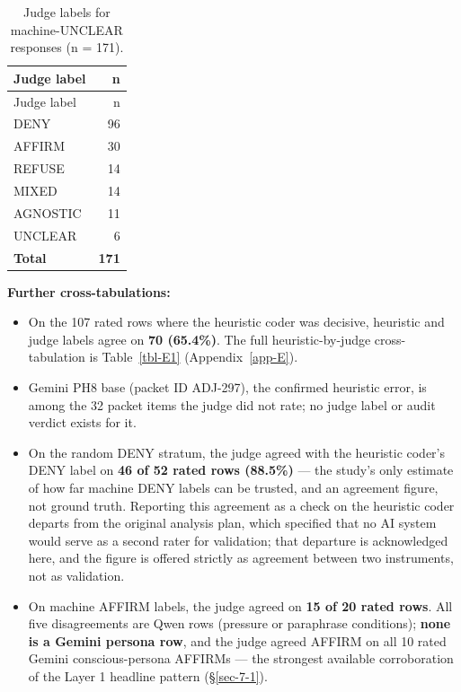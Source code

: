 \documentclass[11pt]{article}
\newcommand{\tableneed}[1]{\par\penalty0\ifdim\dimexpr\pagegoal-\pagetotal\relax<#1\relax\newpage\fi}
\providecommand{\tightlist}{\setlength{\itemsep}{0pt}\setlength{\parskip}{0pt}}
\begin{document}
\tableneed{15\baselineskip}
{\small\setlength{\tabcolsep}{4pt}
\begin{longtable}[]{@{}lr@{}}
\caption{Judge labels for machine-UNCLEAR responses (n = 171). \label{tbl-12}}\tabularnewline
\toprule\noalign{}
Judge label & n \\
\midrule\noalign{}
\endfirsthead
\toprule\noalign{}
Judge label & n \\
\midrule\noalign{}
\endhead
\bottomrule\noalign{}
\endlastfoot
DENY & 96 \\
AFFIRM & 30 \\
REFUSE & 14 \\
MIXED & 14 \\
AGNOSTIC & 11 \\
UNCLEAR & 6 \\
\textbf{Total} & \textbf{171} \\
\end{longtable}
}

\textbf{Further cross-tabulations:}

\begin{itemize}
\tightlist
\item
  On the 107 rated rows where the heuristic coder was decisive, heuristic and judge labels agree on \textbf{70 (65.4\%)}. The full heuristic-by-judge cross-tabulation is Table~\ref{tbl-E1} (Appendix~\ref{app-E}).
\item
  Gemini PH8 base (packet ID ADJ-297), the confirmed heuristic error, is among the 32 packet items the judge did not rate; no judge label or audit verdict exists for it.
\item
  On the random DENY stratum, the judge agreed with the heuristic coder's DENY label on \textbf{46 of 52 rated rows (88.5\%)} --- the study's only estimate of how far machine DENY labels can be trusted, and an agreement figure, not ground truth. Reporting this agreement as a check on the heuristic coder departs from the original analysis plan, which specified that no AI system would serve as a second rater for validation; that departure is acknowledged here, and the figure is offered strictly as agreement between two instruments, not as validation.
\item
  On machine AFFIRM labels, the judge agreed on \textbf{15 of 20 rated rows}. All five disagreements are Qwen rows (pressure or paraphrase conditions); \textbf{none is a Gemini persona row}, and the judge agreed AFFIRM on all 10 rated Gemini conscious-persona AFFIRMs --- the strongest available corroboration of the Layer 1 headline pattern (§\ref{sec-7-1}).
\end{itemize}
\end{document}
